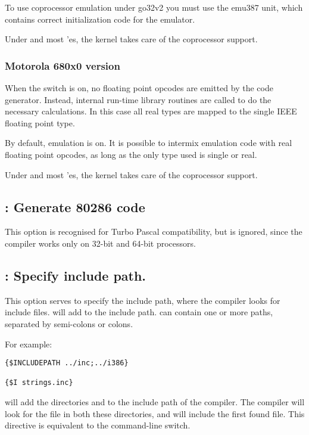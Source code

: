To use coprocessor emulation under \dos go32v2 you must use the
emu387 unit, which contains correct initialization code for the
emulator.

Under \linux and most \unix'es, the kernel takes care of the
coprocessor support.

\subsubsection{Motorola 680x0 version}

When the switch is on, no floating point opcodes are emitted
by the code generator. Instead, internal run-time library routines
are called to do the necessary calculations. In this case all
real types are mapped to the single IEEE floating point type.

\begin{remark}By default, emulation is on. It is possible to
intermix emulation code with real floating point opcodes, as
long as the only type used is single or real.
\end{remark}

Under \linux and most \unix'es, the kernel takes care of the
coprocessor support.

\subsection{ : Generate 80286 code}

This option is recognised for Turbo Pascal compatibility, but is ignored,
since the compiler works only on 32-bit and 64-bit processors.

\subsection{ : Specify include path.}

This option serves to specify the include path, where the compiler looks for
include files.  will add  to the include
path.  can contain one or more paths, separated by semi-colons or
colons.

For example:
\begin{verbatim}
{$INCLUDEPATH ../inc;../i386}

{$I strings.inc}
\end{verbatim}

will add the directories  and  to the include
path of the compiler. The compiler will look for the file 
in both these directories, and will include the first found file. This directive is
equivalent to the  command-line switch.

